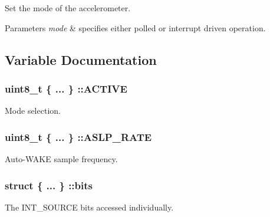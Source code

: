 Set the mode of the accelerometer. 


\begin{DoxyParams}{Parameters}
{\em mode} & specifies either polled or interrupt driven operation. \\
\hline
\end{DoxyParams}


\subsection{Variable Documentation}
\hypertarget{group__accel__module_ga877fd37f4104f273432e5e749ebd4897}{}
\subsubsection[{A\+C\+T\+I\+V\+E}]{\setlength{\rightskip}{0pt plus 5cm}uint8\+\_\+t \{ ... \} \+::A\+C\+T\+I\+V\+E}\label{group__accel__module_ga877fd37f4104f273432e5e749ebd4897}
Mode selection. \hypertarget{group__accel__module_ga8f9c1289ea7907bc60f40c49f0b39e0e}{}
\subsubsection[{A\+S\+L\+P\+\_\+\+R\+A\+T\+E}]{\setlength{\rightskip}{0pt plus 5cm}uint8\+\_\+t \{ ... \} \+::A\+S\+L\+P\+\_\+\+R\+A\+T\+E}\label{group__accel__module_ga8f9c1289ea7907bc60f40c49f0b39e0e}
Auto-\/\+W\+A\+K\+E sample frequency. \hypertarget{group__accel__module_ga6aa35781f533cea2fa76066a4b42602e}{}
\subsubsection[{bits}]{\setlength{\rightskip}{0pt plus 5cm}struct \{ ... \} \+::bits}\label{group__accel__module_ga6aa35781f533cea2fa76066a4b42602e}
The I\+N\+T\+\_\+\+S\+O\+U\+R\+C\+E bits accessed individually. \hypertarget{group__accel__module_ga4a58c14f4e860a98e625babccbf8f6c5}{}
